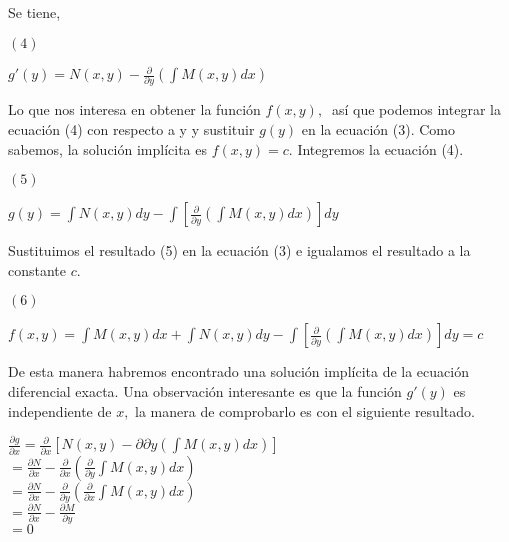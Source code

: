 \documentclass[l etterpaper,11pt]{article}
\begin{document}
Se tiene,
\begin{flushleft} 
$(4)$
\end{flushleft}

\begin{center}

$g\prime(y)=N(x,y)-\frac{\partial}{\partial y}(\int M(x,y)dx)$\\
\end{center}

Lo que nos interesa en obtener la función $ f(x,y),\ $ así que podemos integrar la ecuación (4) con respecto a y y sustituir $ g(y) $ en la ecuación (3). Como sabemos, la solución implícita es $ f(x,y)=c.$  Integremos la ecuación (4).
\begin{flushleft} 
$(5)$
\end{flushleft}

\begin{center}

$g(y)=\int N(x,y)dy-\int[\frac{\partial}{\partial y}(\int M(x,y)dx)]dy$\\
\end{center}

Sustituimos el resultado (5) en la ecuación (3) e igualamos el resultado a la constante $ c.$
\begin{center}
\begin{flushleft} 
$(6)$
\end{flushleft}


$f(x,y)=\int M(x,y)dx+\int N(x,y)dy-\int[\frac{\partial}{\partial y}(\int M(x,y)dx)]dy=c$\\
\end{center}

De esta manera habremos encontrado una solución implícita de la ecuación diferencial exacta.
Una observación interesante es que la función $ g\prime(y) $ es independiente de $ x, $ la manera de comprobarlo es con el siguiente resultado.
\begin{center}

$\frac{\partial g}{\partial x}=\frac{\partial}{\partial x}[N(x,y)-\partial\partial y(\int M(x,y)dx)]$\\
$=\frac{\partial N}{\partial x}-\frac{\partial}{\partial x}(\frac{\partial}{\partial y}\int M(x,y)dx)$\\
$=\frac{\partial N}{\partial x}-\frac{\partial}{\partial y}(\frac{\partial}{\partial x}\int M(x,y)dx)$\\
$=\frac{\partial N}{\partial x}-\frac{\partial M}{\partial y}$\\
$=0$\\
\end{center}
\end{document}
